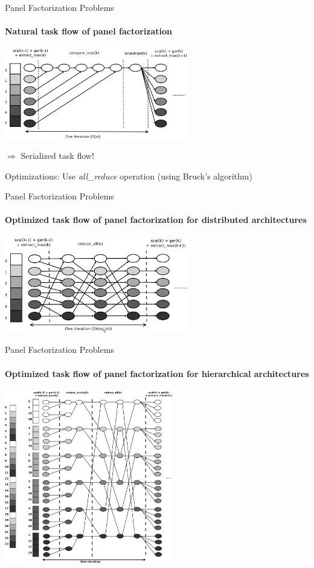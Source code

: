 \begin{frame}{Panel Factorization Problems}
\framesubtitle{Natural task flow of panel factorization}
\begin{center}
\includegraphics[width=0.6\textwidth]{natural_tf_bw}
\end{center}
\pause
\begin{center}
$\Rightarrow$ Serialized task flow!
\end{center}
\pause
\begin{exampleblock}{Optimizations:}
Use \emph{all\_reduce} operation (using Bruck's algorithm)
\end{exampleblock}{}
\end{frame}

\begin{frame}{Panel Factorization Problems}
\framesubtitle{Optimized task flow of panel factorization for distributed architectures}
\begin{center}
\includegraphics[width=0.6\textwidth]{distributed_tf_bw}
\end{center}
\end{frame}

\begin{frame}{Panel Factorization Problems}
\framesubtitle{Optimized task flow of panel factorization for hierarchical architectures}
\begin{center}
\includegraphics[width=0.55\textwidth]{hybrid_tf_bw}
\end{center}
\end{frame}

